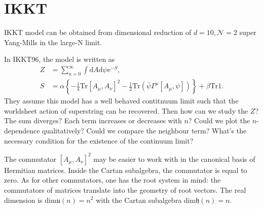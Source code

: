 \section{IKKT}
IKKT model
can be obtained from dimensional reduction of
$d=10,\mathcal{N} = 2$ super Yang-Mills in the large-N limit.

In IKKT96,
the model is written as
\begin{align}
	Z &= \sum_{n=0}^{\infty} \int \mathrm{d} A \mathrm{d} \psi \mathrm{e}^{-S},\\
	S &= \alpha \left\{-\frac{1}{4}\mathrm{Tr}[A_\mu,A_\nu]^2 - \frac{1}{2}\mathrm{Tr}(\bar{\psi}\Gamma^\mu[A_\mu,\psi])\right\} + \beta \mathrm{Tr}1
.\end{align}
They assume this model has a well behaved contitnuum limit
such that the worldsheet action of superstring can be recovered.
Then how can we study the $Z$?
The sum diverges? Each term increases or decreases with $n$?
Could we plot the $n$-dependence qualitatively?
Could we compare the neighbour term?
What's the necessary condition for the existence of the continuum limit?

The commutator $[A_\mu,A_\nu]^2$ may be easier to work with in the canonical basis of Hermitian matrices.
Inside the Cartan subalgebra, the commutator is equal to zero.
As for other commutators, one has the root system in mind:
the commutators of matrices translate into the geometry of root vectors.
The real dimension is $\mathrm{dim}\mathfrak{u}(n) = n^2 $ with the Cartan subalgebra $\mathrm{dim}\mathfrak{h}(n)=n$.

